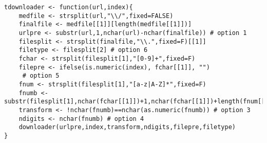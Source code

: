 \documentclass{article}
\begin{document}
\begin{lstlisting}
tdownloader <- function(url,index){
    medfile <- strsplit(url,"\\/",fixed=FALSE)
    finalfile <- medfile[[1]][length(medfile[[1]])]
    urlpre <- substr(url,1,nchar(url)-nchar(finalfile)) # option 1
    filesplit <- strsplit(finalfile,"\\.",fixed=F)[[1]]
    filetype <- filesplit[2] # option 6
    fchar <- strsplit(filesplit[1],"[0-9]+",fixed=F)
    filepre <- ifelse(is.numeric(index), fchar[[1]], "")
     # option 5
    fnum <- strsplit(filesplit[1],"[a-z|A-Z]*",fixed=F)
    fnumb <- substr(filesplit[1],nchar(fchar[[1]])+1,nchar(fchar[[1]])+length(fnum[[1]])-1)
    transform <- !nchar(fnumb)==nchar(as.numeric(fnumb)) # option 3
    ndigits <- nchar(fnumb) # option 4
    downloader(urlpre,index,transform,ndigits,filepre,filetype)
}
\end{lstlisting}
\end{document}
